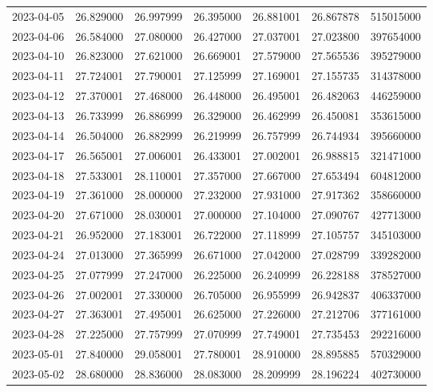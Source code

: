 \begin{tabular}{lrrrrrr}
2023-04-05 &   26.829000 &   26.997999 &   26.395000 &   26.881001 &   26.867878 &   515015000 \\
2023-04-06 &   26.584000 &   27.080000 &   26.427000 &   27.037001 &   27.023800 &   397654000 \\
2023-04-10 &   26.823000 &   27.621000 &   26.669001 &   27.579000 &   27.565536 &   395279000 \\
2023-04-11 &   27.724001 &   27.790001 &   27.125999 &   27.169001 &   27.155735 &   314378000 \\
2023-04-12 &   27.370001 &   27.468000 &   26.448000 &   26.495001 &   26.482063 &   446259000 \\
2023-04-13 &   26.733999 &   26.886999 &   26.329000 &   26.462999 &   26.450081 &   353615000 \\
2023-04-14 &   26.504000 &   26.882999 &   26.219999 &   26.757999 &   26.744934 &   395660000 \\
2023-04-17 &   26.565001 &   27.006001 &   26.433001 &   27.002001 &   26.988815 &   321471000 \\
2023-04-18 &   27.533001 &   28.110001 &   27.357000 &   27.667000 &   27.653494 &   604812000 \\
2023-04-19 &   27.361000 &   28.000000 &   27.232000 &   27.931000 &   27.917362 &   358660000 \\
2023-04-20 &   27.671000 &   28.030001 &   27.000000 &   27.104000 &   27.090767 &   427713000 \\
2023-04-21 &   26.952000 &   27.183001 &   26.722000 &   27.118999 &   27.105757 &   345103000 \\
2023-04-24 &   27.013000 &   27.365999 &   26.671000 &   27.042000 &   27.028799 &   339282000 \\
2023-04-25 &   27.077999 &   27.247000 &   26.225000 &   26.240999 &   26.228188 &   378527000 \\
2023-04-26 &   27.002001 &   27.330000 &   26.705000 &   26.955999 &   26.942837 &   406337000 \\
2023-04-27 &   27.363001 &   27.495001 &   26.625000 &   27.226000 &   27.212706 &   377161000 \\
2023-04-28 &   27.225000 &   27.757999 &   27.070999 &   27.749001 &   27.735453 &   292216000 \\
2023-05-01 &   27.840000 &   29.058001 &   27.780001 &   28.910000 &   28.895885 &   570329000 \\
2023-05-02 &   28.680000 &   28.836000 &   28.083000 &   28.209999 &   28.196224 &   402730000 \\

\end{tabular}
